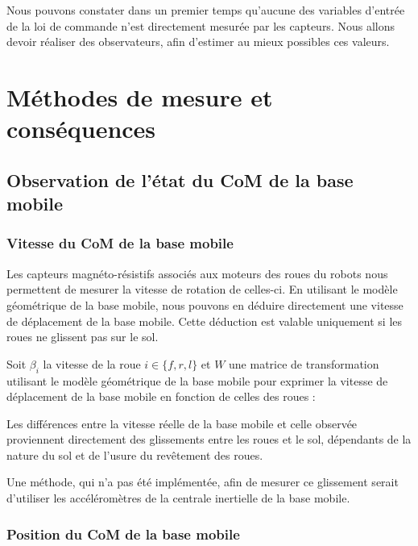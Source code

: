 		Nous pouvons constater dans un premier temps qu'aucune des variables d'entrée de la loi de commande n'est directement mesurée par les capteurs.
		Nous allons devoir réaliser des observateurs, afin d'estimer au mieux possibles ces valeurs.

	\section{Méthodes de mesure et conséquences}
		\subsection{Observation de l'état du CoM de la base mobile}
		\label{section.observateurbase}	
			\subsubsection{Vitesse du CoM de la base mobile}
			
				Les capteurs magnéto-résistifs associés aux moteurs des roues du robots nous permettent de mesurer la vitesse de rotation de celles-ci.
				En utilisant le modèle géométrique de la base mobile, nous pouvons en déduire directement une vitesse de déplacement de la base mobile.
				Cette déduction est valable uniquement si les roues ne glissent pas sur le sol.
				
				Soit $\beta_i$ la vitesse de la roue $i \in \{f, r, l\}$ et $W$ une matrice de transformation utilisant le modèle géométrique de la base mobile pour exprimer la vitesse de déplacement de la base mobile en fonction de celles des roues :
				
				Les différences entre la vitesse réelle de la base mobile et celle observée proviennent directement des glissements entre les roues et le sol, dépendants de la nature du sol et de l'usure du revêtement des roues.
				
				Une méthode, qui n'a pas été implémentée, afin de mesurer ce glissement serait d'utiliser les accéléromètres de la centrale inertielle de la base mobile. 
			
			\subsubsection{Position du CoM de la base mobile}
			
